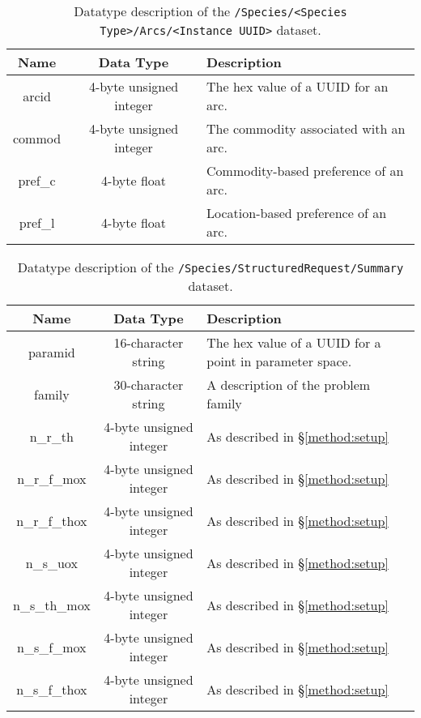 \begin{table}[h!]
\centering
\label{tbl:/Species/StructuredRequest/Arcs/id_8017b48888ac424fb991527195a831b6}
\caption{Datatype description of the \lstinline[basicstyle=\ttfamily\color{black}]|/Species/<Species Type>/Arcs/<Instance UUID>| dataset.}
\begin{tabularx}{\columnwidth-10pt}{|c|c|X|} %
\hline
\textbf{Name} & \textbf{Data Type} & \textbf{Description}       \\ \hline
arcid & 4-byte unsigned integer & The hex value of a UUID for an arc. \\ \hline
commod & 4-byte unsigned integer & The commodity associated with an arc. \\ \hline
pref\_c & 4-byte float & Commodity-based preference of an arc. \\ \hline
pref\_l & 4-byte float & Location-based preference of an arc. \\ \hline
\end{tabularx}
\end{table}

\begin{table}[h!]
\centering
\label{tbl:/Species/StructuredRequest/Summary}
\caption{Datatype description of the \lstinline[basicstyle=\ttfamily\color{black}]|/Species/StructuredRequest/Summary| dataset.}
\begin{tabularx}{\columnwidth-10pt}{|c|c|X|} %
\hline
\textbf{Name} & \textbf{Data Type} & \textbf{Description}       \\ \hline
paramid & 16-character string & The hex value of a UUID for a point in parameter space. \\ \hline
family & 30-character string & A description of the problem family \\ \hline
n\_r\_th & 4-byte unsigned integer & As described in \S \ref{method:setup} \\ \hline
n\_r\_f\_mox & 4-byte unsigned integer & As described in \S \ref{method:setup} \\ \hline
n\_r\_f\_thox & 4-byte unsigned integer & As described in \S \ref{method:setup} \\ \hline
n\_s\_uox & 4-byte unsigned integer & As described in \S \ref{method:setup} \\ \hline
n\_s\_th\_mox & 4-byte unsigned integer & As described in \S \ref{method:setup} \\ \hline
n\_s\_f\_mox & 4-byte unsigned integer & As described in \S \ref{method:setup} \\ \hline
n\_s\_f\_thox & 4-byte unsigned integer & As described in \S \ref{method:setup} \\ \hline
\end{tabularx}
\end{table}

